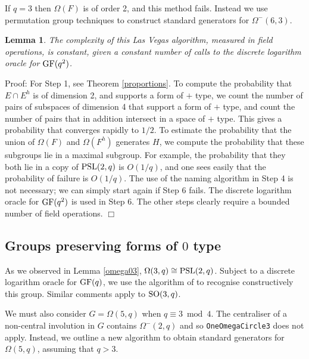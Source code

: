 \documentclass[12pt]{article}
\newtheorem{lemma}[definition]{Lemma}
\newenvironment{proof}{\normalsize {\sc Proof}:}{{\hfill $\Box$ \\}}
\def\SO{{\rm SO}}
\def\Oh{O}  %
\def\PSL{{\rm PSL}}
\def\GF{{\rm GF}}
\begin{document}
If $q=3$ then $\Omega(F)$ is of order 2, and this method fails.
Instead we use permutation group techniques to 
construct standard generators for $\Omega^-(6, 3)$.

\begin{lemma}
The complexity of this Las Vegas algorithm, measured in field operations, 
is constant, given a constant number of calls to the discrete logarithm 
oracle for $\GF(q^2)$.
\end{lemma}
\begin{proof}
For Step 1, see Theorem \ref{proportions}.
To compute the probability 
that $E\cap E^h$ is of dimension 2, and supports a form of
$+$ type, we count the number of pairs of subspaces of dimension 4 that 
support a form of $+$ type, and count the number of
pairs that in addition intersect in a space of $+$ type.  
This gives a probability that converges rapidly to $1/2$.  
To estimate the probability
that the union of $\Omega(F)$ and $\Omega(F^h)$ generates 
$H$, we compute the probability that these 
subgroups lie in a maximal subgroup.  For
example, the probability that they both lie in a copy of 
$\PSL(2,q)$ is $\Oh(1/q)$, and one sees easily that the 
probability of failure is $\Oh(1/q)$.  The use of the naming algorithm in
Step 4 is not necessary; we can simply start again if Step 6 fails.
The discrete logarithm oracle for $\GF(q^2)$ is used in Step 6.
The other steps clearly require a bounded number of field operations.
\end{proof}

\subsection{Groups preserving forms of $0$ type}
As we observed in Lemma \ref{omega03}, 
$\Omega(3, q) \cong \PSL(2,q)$. 
Subject to a discrete logarithm oracle for $\GF(q)$,  
we use the algorithm of \cite{Conderetal05} 
to recognise constructively this group. 
Similar comments apply to $\SO(3,q)$. 

We must also consider $G=\Omega(5,q)$ when $q\equiv 3\bmod 4$.
The centraliser of a non-central involution in $G$ 
contains $\Omega^-(2,q)$ and so 
{\tt OneOmegaCircle3} does not apply. 
Instead, we outline a new algorithm to obtain standard generators 
for $\Omega(5,q)$, assuming that $q > 3$.
\end{document}
